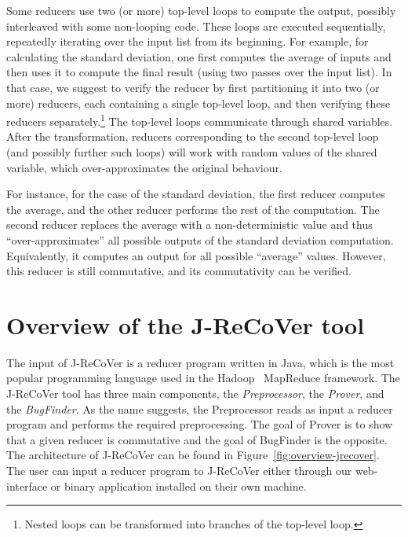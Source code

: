 \documentclass{llncs}
\begin{document}
Some reducers use two (or more) top-level loops to compute the output, possibly
interleaved with some non-looping code. {\color{red} These loops are executed
sequentially, repeatedly iterating over the input list from its beginning.} For
example, for calculating the standard deviation, one first computes the average
of inputs and then uses it to compute the final result (using two passes over
the input list). In that case, we suggest to verify the reducer by first
partitioning it into two (or more) reducers, each containing a single top-level
loop, and then verifying these reducers separately.\footnote{\color{red}Nested
loops can be transformed into branches of the top-level loop.} The top-level
loops communicate through shared variables.  After the transformation, reducers
corresponding to the second top-level loop (and possibly further such loops)
will work with random values of the shared variable, which over-approximates the
original behaviour.

For instance, for the case of the standard deviation, the first reducer computes
the average, and the other reducer performs the rest of the computation. The
second reducer replaces the average with a non-deterministic value and thus
``over-approximates'' all possible outputs of the standard deviation
computation. Equivalently, it computes an output for all possible ``average''
values. However, this reducer is still commutative, and its commutativity can be
verified.

\section{Overview of the J-ReCoVer tool} \label{sec:overview}


The input of J-ReCoVer is a reducer program written in Java, which is the most popular programming language used in the Hadoop~\cite{hadoop} MapReduce framework.
The J-ReCoVer tool has three main components, the \emph{Preprocessor}, the \emph{Prover}, and the \emph{BugFinder}. As the name suggests, the Preprocessor reads as input a reducer program and performs the required preprocessing.  The goal of Prover is to show that a given reducer is commutative and the goal of BugFinder is the opposite. The architecture of J-ReCoVer can be found in Figure~\ref{fig:overview-jrecover}. The user can input a reducer program to J-ReCoVer either through our web-interface or binary application installed on their own machine.
\end{document}
